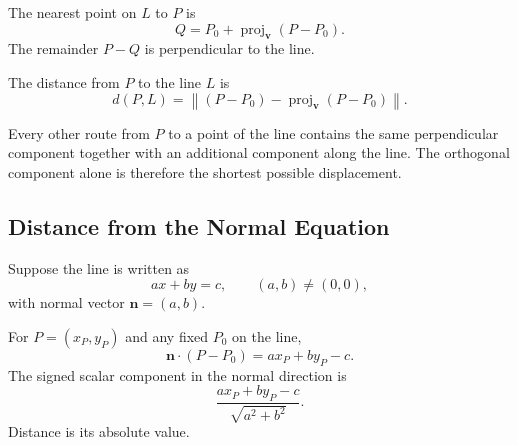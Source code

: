 \begin{theorembox}
The nearest point on $L$ to $P$ is
\[
\boxed{
Q=P_0+\operatorname{proj}_{\mathbf v}(P-P_0)
}.
\]
The remainder $P-Q$ is perpendicular to the line.
\end{theorembox}

\begin{center}
\end{center}

\begin{definitionbox}
The distance from $P$ to the line $L$ is
\[
\boxed{
d(P,L)
=
\left\|
(P-P_0)-\operatorname{proj}_{\mathbf v}(P-P_0)
\right\|
}.
\]
\end{definitionbox}

\begin{interpretationbox}
Every other route from $P$ to a point of the line contains the same perpendicular
component together with an additional component along the line. The orthogonal
component alone is therefore the shortest possible displacement.
\end{interpretationbox}

\subsection{Distance from the Normal Equation}

Suppose the line is written as
\[
ax+by=c,
\qquad (a,b)\neq(0,0),
\]
with normal vector $\mathbf n=(a,b)$.

\begin{derivationbox}
For $P=(x_P,y_P)$ and any fixed $P_0$ on the line,
\[
\mathbf n\cdot(P-P_0)=ax_P+by_P-c.
\]
The signed scalar component in the normal direction is
\[
\frac{ax_P+by_P-c}{\sqrt{a^2+b^2}}.
\]
Distance is its absolute value.
\end{derivationbox}


